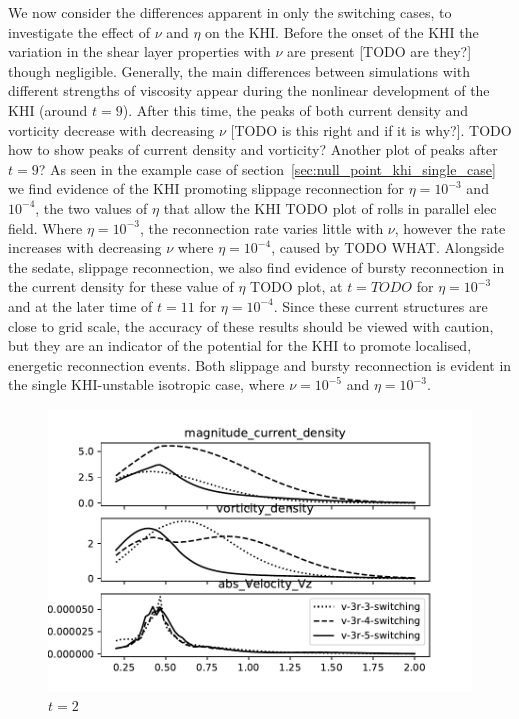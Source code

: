 We now consider the differences apparent in only the switching cases, to investigate the effect of $\nu$ and $\eta$ on the KHI. Before the onset of the KHI the variation in the shear layer properties with $\nu$ are present [TODO are they?] though negligible. Generally, the main differences between simulations with different strengths of viscosity appear during the nonlinear development of the KHI (around $t=9$). After this time, the peaks of both current density and vorticity decrease with decreasing $\nu$ [TODO is this right and if it is why?]. TODO how to show peaks of current density and vorticity? Another plot of peaks after $t=9$? As seen in the example case of section~\ref{sec:null_point_khi_single_case} we find evidence of the KHI promoting slippage reconnection for $\eta = 10^{-3}$ and $10^{-4}$, the two values of $\eta$ that allow the KHI TODO plot of rolls in parallel elec field. Where $\eta=10^{-3}$, the reconnection rate varies little with $\nu$, however the rate increases with decreasing $\nu$ where $\eta=10^{-4}$, caused by TODO WHAT. Alongside the sedate, slippage reconnection, we also find evidence of bursty reconnection in the current density for these value of $\eta$ TODO plot, at $t=TODO$ for $\eta=10^{-3}$ and at the later time of $t=11$ for $\eta=10^{-4}$. Since these current structures are close to grid scale, the accuracy of these results should be viewed with caution, but they are an indicator of the potential for the KHI to promote localised, energetic reconnection events. Both slippage and bursty reconnection is evident in the single KHI-unstable isotropic case, where $\nu=10^{-5}$ and $\eta=10^{-3}$.

\begin{figure}[h]
  \centering
  \includegraphics[width=0.8\linewidth]{./images/null_point_khi/azimuthal_averages_v-3_2.pdf}
  \caption{$t=2$}%
  \label{fig:azimuthal_averages_v-3_2}
\end{figure}

